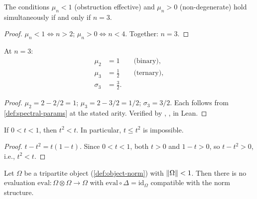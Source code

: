 \begin{theorem}\label{thm:arity-unique}
The conditions $\mu_n < 1$ (obstruction effective) and $\mu_n > 0$
(non-degenerate) hold simultaneously if and only if $n=3$.
\end{theorem}

\begin{proof}
$\mu_n < 1 \iff n > 2$; $\mu_n > 0 \iff n < 4$.
Together: $n=3$. \end{proof}

\begin{corollary}\label{cor:spectral-values}
At $n=3$:
\begin{align}
  \mu_2 &= 1 \qquad\text{(binary)},
    \label{eq:mu-binary}  \\
  \mu_3 &= \tfrac{1}{2} \qquad\text{(ternary)},
    \label{eq:mu-ternary}  \\
  \sigma_3 &= \tfrac{3}{2}.
    \label{eq:sigma-ternary}
\end{align}
\end{corollary}

\begin{proof}
$\mu_2 = 2 - 2/2 = 1$; $\mu_3 = 2 - 3/2 = 1/2$;
$\sigma_3 = 3/2$.  Each follows from
\cref{def:spectral-params} at the stated arity.
Verified by , ,
 in Lean.
\end{proof}



\begin{lemma}\label{lem:diagonal-contraction}
If $0<t<1$, then $t^2 < t$. In particular, $t\le t^2$ is impossible.
\end{lemma}

\begin{proof}
$t - t^2 = t(1-t)$.  Since $0<t<1$, both $t>0$ and $1-t>0$, so
$t-t^2>0$, i.e., $t^2 < t$.
\end{proof}

\begin{theorem}\label{thm:no-diagonal}
Let $\Omega$ be a tripartite object
(\cref{def:object-norm}) with
$\|\Omega\|<1$. Then there is no evaluation
$\mathrm{eval}\colon\Omega\otimes\Omega\to\Omega$ with
$\mathrm{eval}\circ\Delta=\mathrm{id}_\Omega$ compatible with the norm
structure.
\end{theorem}

